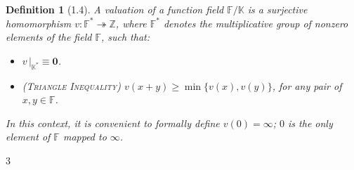 \documentclass[11pt]{article}
\theoremstyle{scplain}
\newtheorem*{definition}{Definition}
\begin{document}
\begin{definition}[1.4]
A valuation of a function field $\mathbb{F}/\mathbb{K}$ is a surjective
homomorphism $v : \mathbb{F}^* \twoheadrightarrow \mathbb{Z}$, where $\mathbb{F}^*$
denotes the multiplicative group of nonzero elements of the field $\mathbb{F}$,
such that:
\begin{itemize}
\item[(a)] $v\,|_{\mathbb{K}^*} \equiv \mathbf{0}$.

\item[(b)] (\textsc{Triangle Inequality}) $v(x + y) \geq \min\{v(x), v(y)\}$, for
  any pair of $x, y \in \mathbb{F}$.
\end{itemize}
\indent In this context, it is convenient to formally define $v(0) = \infty$; $0$
is the only element of $\mathbb{F}$ mapped to $\infty$.
\end{definition}

\begin{center}3\end{center}
\end{document}
